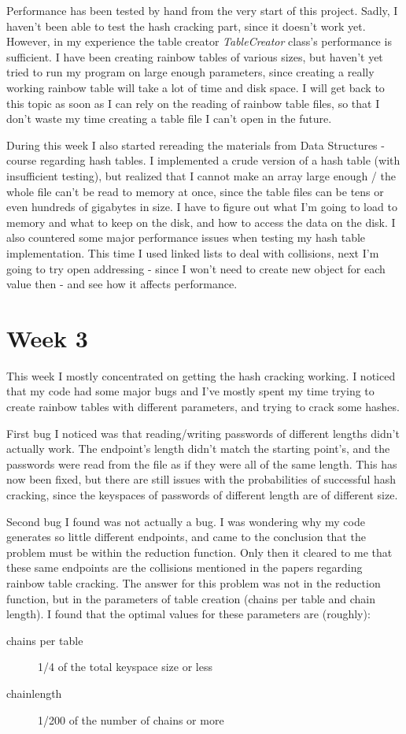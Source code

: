 \documentclass[a4paper, 11pt, finnish]{article}
\begin{document}
Performance has been tested by hand from the very start of this project. Sadly, I haven't been able to test the hash cracking part, since it doesn't work yet. However, in my experience the table creator \emph{TableCreator} class's performance is sufficient. I have been creating rainbow tables of various sizes, but haven't yet tried to run my program on large enough parameters, since creating a really working rainbow table will take a lot of time and disk space. I will get back to this topic as soon as I can rely on the reading of rainbow table files, so that I don't waste my time creating a table file I can't open in the future.

During this week I also started rereading the materials from Data Structures -course regarding hash tables. I implemented a crude version of a hash table (with insufficient testing), but realized that I cannot make an array large enough / the whole file can't be read to memory at once, since the table files can be tens or even hundreds of gigabytes in size. I have to figure out what I'm going to load to memory and what to keep on the disk, and how to access the data on the disk. I also countered some major performance issues when testing my hash table implementation. This time I used linked lists to deal with collisions, next I'm going to try open addressing - since I won't need to create new object for each value then - and see how it affects  performance.

\section*{Week 3}
This week I mostly concentrated on getting the hash cracking working. I noticed that my code had some major bugs and I've mostly spent my time trying to create rainbow tables with different parameters, and trying to crack some hashes.

First bug I noticed was that reading/writing passwords of different lengths didn't actually work. The endpoint's length didn't match the starting point's, and the passwords were read from the file as if they were all of the same length. This has now been fixed, but there are still issues with the probabilities of successful hash cracking, since the keyspaces of passwords of different length are of different size.

Second bug I found was not actually a bug. I was wondering why my code generates so little different endpoints, and came to the conclusion that the problem must be within the reduction function. Only then it cleared to me that these same endpoints are the collisions mentioned in the papers regarding rainbow table cracking. The answer for this problem was not in the reduction function, but in the parameters of table creation (chains per table and chain length). I found that the optimal values for these parameters are (roughly):
\begin{description}
\item[chains per table] 1/4 of the total keyspace size or less
\item[chainlength] 1/200 of the number of chains or more
\end{description}
\end{document}
